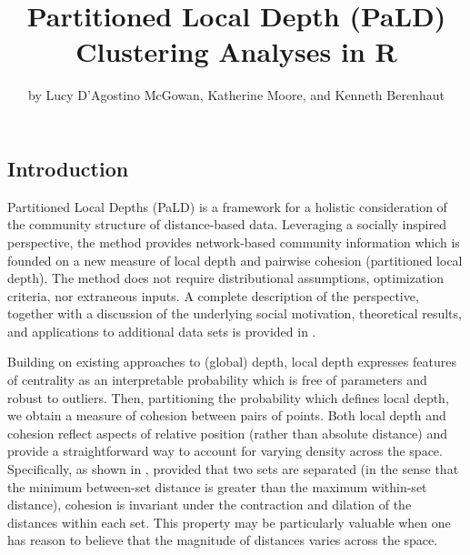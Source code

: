 \title{Partitioned Local Depth (PaLD) Clustering Analyses in R}
\author{by Lucy D'Agostino McGowan, Katherine Moore, and Kenneth Berenhaut}

\maketitle


\hypertarget{introduction}{%
\subsection{Introduction}\label{introduction}}

Partitioned Local Depths (PaLD) is a framework for a holistic
consideration of the community structure of distance-based data.
Leveraging a socially inspired perspective, the method provides
network-based community information which is founded on a new measure of
local depth and pairwise cohesion (partitioned local depth). The method
does not require distributional assumptions, optimization criteria, nor
extraneous inputs. A complete description of the perspective, together
with a discussion of the underlying social motivation, theoretical
results, and applications to additional data sets is provided in
\citet{berenhaut2022social}.

Building on existing approaches to (global) depth, local depth expresses
features of centrality as an interpretable probability which is free of
parameters and robust to outliers. Then, partitioning the probability
which defines local depth, we obtain a measure of cohesion between pairs
of points. Both local depth and cohesion reflect aspects of relative
position (rather than absolute distance) and provide a straightforward
way to account for varying density across the space. Specifically, as
shown in \citet{berenhaut2022social}, provided that two sets are
separated (in the sense that the minimum between-set distance is greater
than the maximum within-set distance), cohesion is invariant under the
contraction and dilation of the distances within each set. This property
may be particularly valuable when one has reason to believe that the
magnitude of distances varies across the space.

